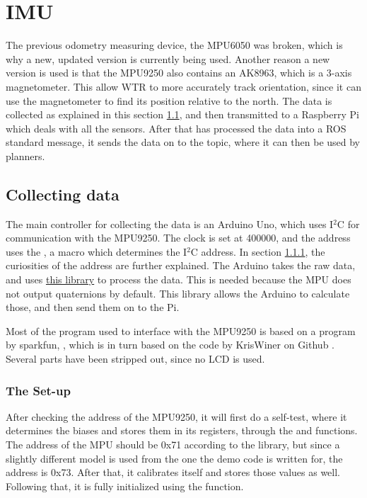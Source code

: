 \section{IMU}
\label{sec::IMU}
The previous odometry measuring device, the MPU6050 \cite{MPU6050} was broken, which is why a new, updated version is currently being used.
Another reason a new version is used is that the MPU9250 \cite{MPU9250} also contains an AK8963, which is a 3-axis magnetometer.
This allow WTR to more accurately track orientation, since it can use the magnetometer to find its position relative to the north.
The data is collected as explained in this section \ref{sec::collect}, and then transmitted to a Raspberry Pi which deals with all the sensors.
After that has processed the data into a ROS standard message, it sends the data on to the topic, where it can then be used by planners.

\subsection{Collecting data} \label{sec::collect}
The main controller for collecting the data is an Arduino Uno, which uses I$^{2}$C for communication with the MPU9250.
The clock is set at 400000, and the address uses the , a macro which determines the I$^{2}$C address.
In section \ref{sec::set-up}, the curiosities of the address are further explained.
The Arduino takes the raw data, and uses \href{https://github.com/sparkfun/SparkFun_MPU-9250_Breakout_Arduino_Library}{this library} to process the data.
This is needed because the MPU does not output quaternions by default.
This library allows the Arduino to calculate those, and then send them on to the Pi.

Most of the program used to interface with the MPU9250 is based on a program by sparkfun, \cite{sparkfunMPU9250}, which is in turn based on the code by KrisWiner on Github \cite{kriswiner}.
Several parts have been stripped out, since no LCD is used.


\subsubsection{The Set-up} \label{sec::set-up}
After checking the address of the MPU9250, it will first do a self-test, where it determines the biases and stores them in its registers, through the  and  functions.
The address of the MPU should be 0x71 according to the library, but since a slightly different model is used from the one the demo code is written for, the address is 0x73.
After that, it calibrates itself and stores those values as well.
Following that, it is fully initialized using the  function.

